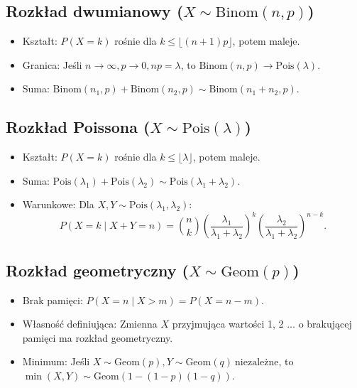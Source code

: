 \documentclass{article}
\theoremstyle{definition}
\theoremstyle{remark}
\begin{document}
\begin{multicols}{2}
    \subsection*{Rozkład dwumianowy (\( X \sim \text{Binom}(n, p) \))}
    \begin{itemize}[itemsep=0pt, left=0pt]
        \item Kształt: \( P(X=k) \) rośnie dla \( k \leq \lfloor (n+1)p \rfloor \), potem maleje.
        \item Granica: Jeśli \( n \to \infty, p \to 0, np = \lambda \), to \( \text{Binom}(n, p) \to \text{Pois}(\lambda) \).
        \item Suma: \( \text{Binom}(n_1, p) + \text{Binom}(n_2, p) \sim \text{Binom}(n_1+n_2, p) \).
    \end{itemize}
    
    \subsection*{Rozkład Poissona (\( X \sim \text{Pois}(\lambda) \))}
    \begin{itemize}[itemsep=0pt, left=0pt]
        \item Kształt: \( P(X=k) \) rośnie dla \( k \leq \lfloor \lambda \rfloor \), potem maleje.
        \item Suma: \( \text{Pois}(\lambda_1) + \text{Pois}(\lambda_2) \sim \text{Pois}(\lambda_1+\lambda_2) \).
        \item Warunkowe: Dla \( X, Y \sim \text{Pois}(\lambda_1, \lambda_2) \):
        \[
        P(X=k \mid X+Y=n) = \binom{n}{k} \left(\frac{\lambda_1}{\lambda_1+\lambda_2}\right)^k \left(\frac{\lambda_2}{\lambda_1+\lambda_2}\right)^{n-k}.
        \]
    \end{itemize}
    
    \subsection*{Rozkład geometryczny (\( X \sim \text{Geom}(p) \))}
    \begin{itemize}[itemsep=0pt, left=0pt]
        \item Brak pamięci: \( P(X=n \mid X>m) = P(X=n-m) \).
        \item Własność definiująca: Zmienna \( X \) przyjmująca wartości 1, 2 \(\ldots\)  o brakującej pamięci ma rozkład geometryczny.
        \item Minimum: Jeśli \( X \sim \text{Geom}(p), Y \sim \text{Geom}(q) \ \text{niezależne} \), to \( \min(X, Y) \sim \text{Geom}(1-(1-p)(1-q)) \).
    \end{itemize}
    

\end{multicols}
\end{document}
